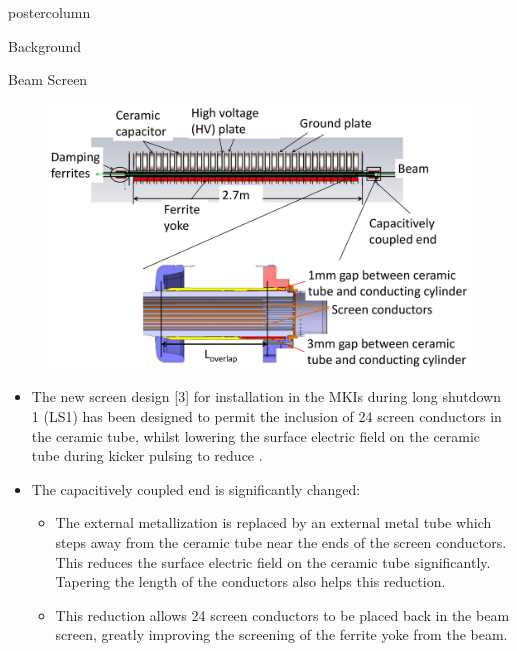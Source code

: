\documentclass[final,hyperref={pdfpagelabels=false}]{beamer}
\begin{document}
\begin{frame}
\begin{columns}
\begin{column}{.49\textwidth}
\begin{beamercolorbox}[center,wd=\textwidth]{postercolumn}
\begin{minipage}[T]{.95\textwidth}
{\begin{block}{Background}
	\end{block}
 \vfill
	\begin{block}{Beam Screen}
\begin{figure}
\includegraphics[width=1.0\textwidth]{beamScreen.pdf}
\end{figure}
\begin{itemize}
\item{The new screen design [3] for installation in the MKIs during long shutdown 1 (LS1) has been designed to permit the inclusion of 24 screen conductors in the ceramic tube, whilst lowering the surface electric field on the ceramic tube during kicker pulsing to reduce .}
\item{The capacitively coupled end is significantly changed:}
\begin{itemize}
\item{The external metallization is replaced by an external metal tube which steps away from the ceramic tube near the ends of the screen conductors. This reduces the surface electric field on the ceramic tube significantly. Tapering the length of the conductors also helps this reduction.}
\item{This reduction allows 24 screen conductors to be placed back in the beam screen, greatly improving the screening of the ferrite yoke from the beam.}
\end{itemize}
\end{itemize}

	\end{block}

            \vfill

}
\end{minipage}
\end{beamercolorbox}
\end{column}
\end{columns}
\end{frame}
\end{document}
